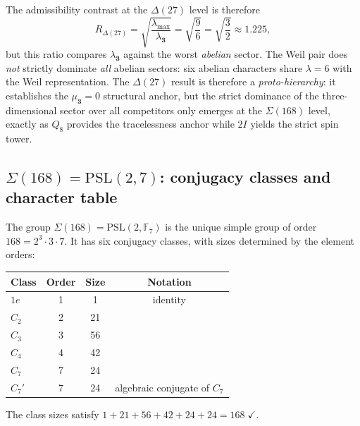 \documentclass[11pt,a4paper]{article}
\begin{document}
    The admissibility contrast at the $\Delta(27)$ level is therefore
    \begin{equation}
      R_{\Delta(27)}
      = \sqrt{\frac{\lambda_{\max}}{\lambda_{\mathbf{3}}}}
      = \sqrt{\frac{9}{6}}
      = \sqrt{\frac{3}{2}}
      \approx 1.225,
      \label{eq:delta27-R}
    \end{equation}
    but this ratio compares $\lambda_{\mathbf{3}}$ against the worst \emph{abelian} sector.
    The Weil pair does \emph{not} strictly dominate \emph{all} abelian sectors: six abelian
    characters share $\lambda = 6$ with the Weil representation.
    The $\Delta(27)$ result is therefore a \emph{proto-hierarchy}: it establishes the
    $\mu_{\mathbf{3}} = 0$ structural anchor, but the strict dominance of the
    three-dimensional sector over all competitors only emerges at the $\Sigma(168)$ level,
    exactly as $Q_8$ provides the tracelessness anchor while $2I$ yields the strict spin
    tower.

  \subsection{$\Sigma(168) = \mathrm{PSL}(2,7)$: conjugacy classes and character table}
    \label{sec:sigma168-chars}

    The group $\Sigma(168) = \mathrm{PSL}(2,\mathbb{F}_7)$ is the unique simple group of
    order~$168 = 2^3 \cdot 3 \cdot 7$.
    It has six conjugacy classes, with sizes determined by the element orders:
    \begin{center}
      \renewcommand{\arraystretch}{1.2}
      \begin{tabular}{lccc}
        \hline
        Class & Order & Size & Notation \\
        \hline
        $1e$  & 1 & 1  & identity \\
        $C_2$ & 2 & 21 & \\
        $C_3$ & 3 & 56 & \\
        $C_4$ & 4 & 42 & \\
        $C_7$ & 7 & 24 & \\
        $C_7'$ & 7 & 24 & algebraic conjugate of $C_7$ \\
        \hline
      \end{tabular}
    \end{center}
    The class sizes satisfy $1 + 21 + 56 + 42 + 24 + 24 = 168\;\checkmark$.
\end{document}
